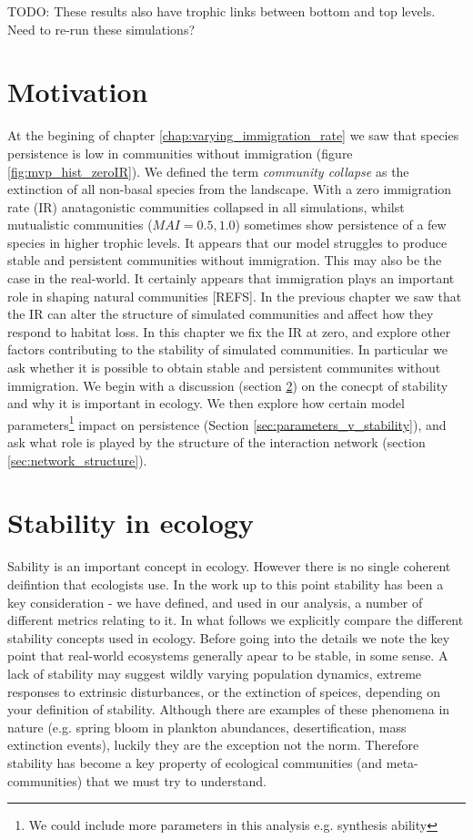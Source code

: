 TODO: These results also have trophic links between bottom and top levels. Need to re-run these simulations?

\section{Motivation}
\label{sec:motivate_stability}

At the begining of chapter \ref{chap:varying_immigration_rate} we saw that species persistence is low in communities without immigration (figure \ref{fig:mvp_hist_zeroIR}). We defined the term \emph{community collapse} as the extinction of all non-basal species from the landscape. With a zero immigration rate (IR) anatagonistic communities collapsed in all simulations, whilst mutualistic communities ($MAI=0.5,1.0$) sometimes show persistence of a few species in higher trophic levels. It appears that our model struggles to produce stable and persistent communities without immigration. This may also be the case in the real-world. It certainly appears that immigration plays an important role in shaping natural communities [REFS]. In the previous chapter we saw that the IR can alter the structure of simulated communities and affect how they respond to habitat loss. In this chapter we fix the IR at zero, and explore other factors contributing to the stability of simulated communities. In particular we ask whether it is possible to obtain stable and persistent communites without immigration. We begin with a discussion (section \ref{sec:lit_review_stability}) on the conecpt of stability and why it is important in ecology. We then explore how certain model parameters\footnote{We could include more parameters in this analysis e.g. synthesis ability} impact on persistence (Section \ref{sec:parameters_v_stability}), and ask what role is played by the structure of the interaction network (section \ref{sec:network_structure}).  

\section{Stability in ecology}
\label{sec:lit_review_stability}

Sability is an important concept in ecology. However there is no single coherent deifintion that ecologists use. In the work up to this point stability has been a key consideration - we have defined, and used in our analysis, a number of different metrics relating to it. In what follows we explicitly compare the different stability concepts used in ecology. Before going into the details we note the key point that real-world ecosystems generally apear to be stable, in some sense. A lack of stability may suggest wildly varying population dynamics, extreme responses to extrinsic disturbances, or the extinction of speices, depending on your definition of stability. Although there are examples of these phenomena in nature (e.g. spring bloom in plankton abundances, desertification, mass extinction events), luckily they are the exception not the norm. Therefore stability has become a key property of ecological communities (and meta-communities) that we must try to understand. 


